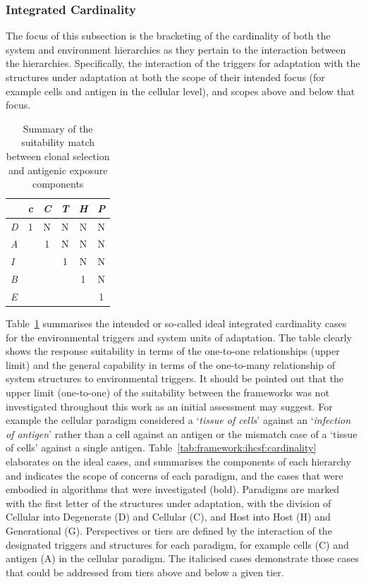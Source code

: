 %
%
\subsubsection{Integrated Cardinality}
\label{subsec:framework:ihcsf:bracketing:cardinality}
The focus of this subsection is the bracketing of the cardinality of both the system and environment hierarchies as they pertain to the interaction between the hierarchies. Specifically, the interaction of the triggers for adaptation with the structures under adaptation at both the scope of their intended focus (for example cells and antigen in the cellular level), and scopes above and below that focus.

\begin{table}[htp]
	\centering\small
		\begin{tabular}{lccccc}
		\toprule
		 & \emph{c} & \emph{C} & \emph{T} & \emph{H} & \emph{P} \\ 
		\toprule
		\emph{D} & 1 & N & N & N & N \\ 
		\emph{A} &  & 1 & N & N & N \\ 
		\emph{I} &  &  & 1 & N & N \\ 
		\emph{B} &  &  &  & 1 & N \\ 
		\emph{E} &  &  &  &  & 1 \\ 
		\bottomrule
		\end{tabular}
	\caption{Summary of the suitability match between clonal selection and antigenic exposure components}
	\label{tab:framework:ihcsa:suitability}
\end{table}	

Table~\ref{tab:framework:ihcsa:suitability} summarises the intended or so-called ideal integrated cardinality cases for the environmental triggers and system units of adaptation. The table clearly shows the response suitability in terms of the one-to-one relationships (upper limit) and the general capability in terms of the one-to-many relationship of system structures to environmental triggers. It should be pointed out that the upper limit (one-to-one) of the suitability between the frameworks was not investigated throughout this work as an initial assessment may suggest. For example the cellular paradigm considered a `\emph{tissue of cells}' against an `\emph{infection of antigen}' rather than a cell against an antigen or the mismatch case of a `tissue of cells' against a single antigen. 
Table~\ref{tab:framework:ihcsf:cardinality} elaborates on the ideal cases, and summarises the components of each hierarchy and indicates the scope of concerns of each paradigm, and the cases that were embodied in algorithms that were investigated (bold). Paradigms are marked with the first letter of the structures under adaptation, with the division of Cellular into Degenerate (D) and Cellular (C), and Host into Host (H) and Generational (G). Perspectives or tiers are defined by the interaction of the designated triggers and structures for each paradigm, for example cells (C) and antigen (A) in the cellular paradigm. The italicised cases demonstrate those cases that could be addressed from tiers above and below a given tier.

